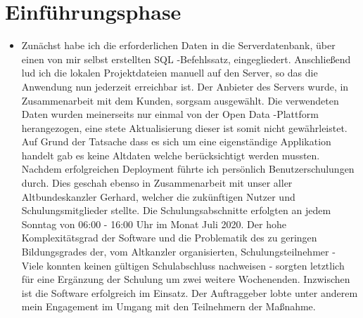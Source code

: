 \section{Einführungsphase}
\label{sec:Einfuehrungsphase}

\begin{itemize}
	\item Zunächst habe ich die erforderlichen Daten in die Serverdatenbank, über einen von mir selbst erstellten SQL -Befehlssatz, eingegliedert. Anschließend lud ich die lokalen Projektdateien manuell auf den Server, so das die Anwendung nun jederzeit erreichbar ist. Der Anbieter des Servers wurde, in Zusammenarbeit mit dem Kunden, sorgsam ausgewählt. 
Die verwendeten Daten wurden meinerseits nur einmal von der Open Data -Plattform herangezogen, eine stete Aktualisierung dieser ist somit nicht gewährleistet. Auf Grund der Tatsache dass es sich um eine eigenständige Applikation handelt gab es keine Altdaten welche berücksichtigt werden mussten. 
Nachdem erfolgreichen Deployment führte ich persönlich Benutzerschulungen durch. Dies geschah ebenso in Zusammenarbeit mit unser aller Altbundeskanzler Gerhard, welcher die zukünftigen Nutzer und Schulungsmitglieder stellte.
Die Schulungsabschnitte erfolgten an jedem Sonntag von 06:00 - 16:00 Uhr im Monat Juli 2020. 
Der hohe Komplexitätsgrad der Software und die Problematik des zu geringen Bildungsgrades der, vom Altkanzler organisierten, Schulungsteilnehmer - Viele konnten keinen gültigen Schulabschluss nachweisen - sorgten letztlich für eine Ergänzung der Schulung um zwei weitere Wochenenden.
Inzwischen ist die Software erfolgreich im Einsatz. Der Auftraggeber lobte unter anderem mein Engagement im Umgang mit den Teilnehmern der Maßnahme.

\end{itemize}
